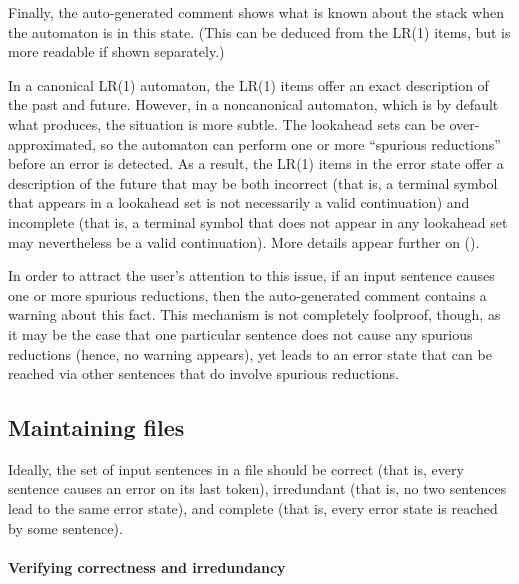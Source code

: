 \documentclass[onecolumn,11pt,nocopyrightspace,preprint]{sigplanconf}
\begin{document}
Finally, the auto-generated comment shows what is known about the stack when
the automaton is in this state. (This can be deduced from the LR(1) items, but
is more readable if shown separately.)

In a canonical LR(1) automaton, the LR(1) items offer an exact description of
the past and future. However, in a noncanonical automaton, which is by default
what \menhir produces, the situation is more subtle. The lookahead sets can be
over-approximated, so the automaton can perform one or more ``spurious
reductions'' before an error is detected. As a result, the LR(1) items in the
error state offer a description of the future that may be both incorrect (that
is, a terminal symbol that appears in a lookahead set is not necessarily a
valid continuation) and incomplete (that is, a terminal symbol that does not
appear in any lookahead set may nevertheless be a valid continuation). More
details appear further on ().

In order to attract the user's attention to this issue, if an input sentence
causes one or more spurious reductions, then the auto-generated comment
contains a warning about this fact. This mechanism is not completely
foolproof, though, as it may be the case that one particular sentence does not
cause any spurious reductions (hence, no warning appears), yet leads to an
error state that can be reached via other sentences that do involve spurious
reductions.


\subsection{Maintaining \messages files}
\label{sec:messages:tools}

Ideally, the set of input sentences in a \messages file should be correct
(that is, every sentence causes an error on its last token), irredundant (that
is, no two sentences lead to the same error state), and complete (that is,
every error state is reached by some sentence).

\paragraph{Verifying correctness and irredundancy}
\end{document}
